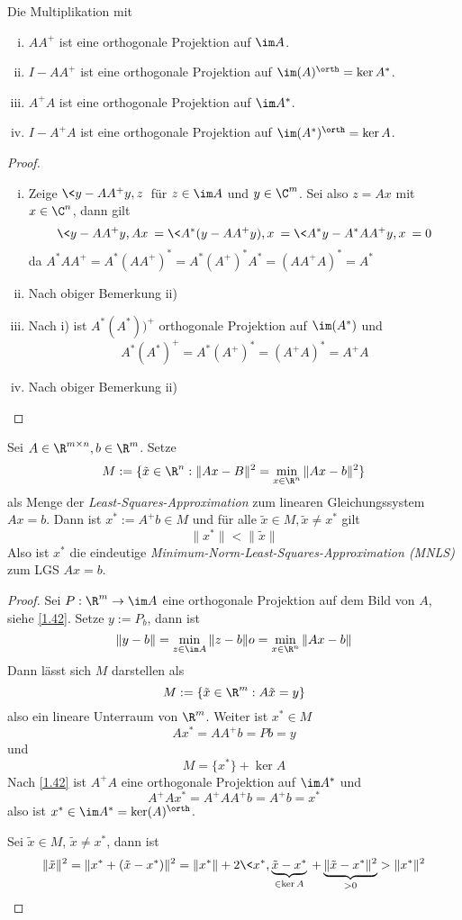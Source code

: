 \documentclass[11pt]{scrartcl}
\begin{document}
\begin{lem}
	\label{1.42}
	Die Multiplikation mit
	\begin{enumerate}[i)]
		\item
			$AA^+$ ist eine orthogonale Projektion auf $\im A$.
		\item
			$I-AA^+$ ist eine orthogonale Projektion auf $\im (A)^\orth = \ker A^*$.
		\item
			$A^+A$ ist eine orthogonale Projektion auf $\im A^*$.
		\item
			$I-A^+A$ ist eine orthogonale Projektion auf $\im (A^*)^\orth = \ker A$.
	\end{enumerate}
	\begin{proof}
		\begin{enumerate}[i)]
			\item
				Zeige $\<y-AA^+y, z\>$ für $z\in \im A$ und $y\in \C^m$.
				Sei also $z=Ax$ mit $x\in \C^n$, dann gilt
				\[
					\<y-AA^+y,Ax\> = \<A^*(y-AA^+y),x\> = \<A^*y - A^*AA^+y,x\> = 0
				\]
				da $A^*AA^+ = A^*(AA^+)^* = A^*(A^+)^* A^* = (AA^+A)^* = A^*$
			\item
				Nach obiger Bemerkung ii)
			\item
				Nach i) ist $A^*(A^*))^+$ orthogonale Projektion auf $\im (A^*)$ und
				\[
					A^*(A^*)^+ = A^*(A^+)^* = (A^+A)^* = A^+A
				\]
			\item
				Nach obiger Bemerkung ii)
		\end{enumerate}
	\end{proof}
\end{lem}

\begin{st}
	\label{1.43}
	Sei $A\in \R^{m\times n}, b\in \R^m$.
	Setze
	\[
		M := \{ \tilde x\in \R^n : \|Ax-B\|^2 = \min_{x\in \R^n}\|Ax-b\|^2\}
	\]
	als Menge der \emph{Least-Squares-Approximation} zum linearen Gleichungssystem $Ax=b$.
	Dann ist $x^* := A^+b \in M$ und für alle $\tilde x\in M, \tilde x \neq x^*$ gilt
	\[
		\|x^*\| < \| \tilde x \|
	\]
	Also ist $x^*$ die eindeutige \emph{Minimum-Norm-Least-Squares-Approximation (MNLS)} zum LGS $Ax=b$.
	\begin{proof}
		Sei $P: \R^m \to \im A$ eine orthogonale Projektion auf dem Bild von $A$, siehe \ref{1.42}.
		Setze $y:= P_b$, dann ist
		\[
			\|y-b\| = \min_{z\in \im A}\|z-b\|o = \min_{x\in \R^n}\|Ax-b\|
		\]
		Dann lässt sich $M$ darstellen als
		\[
			M := \{ \tilde x \in \R^m : A\tilde x = y\}
		\]
		also ein lineare Unterraum von $\R^m$.
		Weiter ist $x^* \in M$
		\[
			Ax^* = AA^+ b = Pb = y
		\]
		und
		\[
			M = \{x^*\} + \ker A
		\]
		Nach \ref{1.42} ist $A^+A$ eine orthogonale Projektion auf $\im A^*$ und 
		\[
			A^+Ax^* = A^+AA^+ b = A^+b = x^*
		\]
		also ist $x^* \in \im A^* = \ker( A)^\orth$.

		Sei $\tilde x \in M$, $\tilde x \neq x^*$, dann ist
		\[
			\|\tilde x\|^2 = \|x^* + (\tilde x - x^*)\|^2 = \|x^*\| + 2\< x^*,\underbrace{\tilde x - x^*}_{\in \ker A}\> + \underbrace{\|\tilde x - x^*\|^2}_{>0} > \|x^*\|^2
		\]
	\end{proof}
\end{st}
\end{document}
